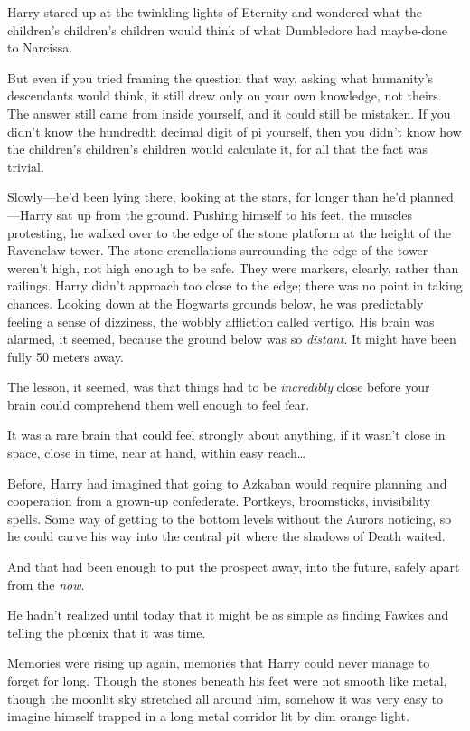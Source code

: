 Harry stared up at the twinkling lights of Eternity and wondered what the children's children's children would think of what Dumbledore had maybe-done to Narcissa.

But even if you tried framing the question that way, asking what humanity's descendants would think, it still drew only on your own knowledge, not theirs. The answer still came from inside yourself, and it could still be mistaken. If you didn't know the hundredth decimal digit of pi yourself, then you didn't know how the children's children's children would calculate it, for all that the fact was trivial.

\later

Slowly—he'd been lying there, looking at the stars, for longer than he'd planned—Harry sat up from the ground. Pushing himself to his feet, the muscles protesting, he walked over to the edge of the stone platform at the height of the Ravenclaw tower. The stone crenellations surrounding the edge of the tower weren't high, not high enough to be safe. They were markers, clearly, rather than railings. Harry didn't approach too close to the edge; there was no point in taking chances. Looking down at the Hogwarts grounds below, he was predictably feeling a sense of dizziness, the wobbly affliction called vertigo. His brain was alarmed, it seemed, because the ground below was so \emph{distant}. It might have been fully 50 meters away.

The lesson, it seemed, was that things had to be \emph{incredibly} close before your brain could comprehend them well enough to feel fear.

It was a rare brain that could feel strongly about anything, if it wasn't close in space, close in time, near at hand, within easy reach{\ldots}

Before, Harry had imagined that going to Azkaban would require planning and cooperation from a grown-up confederate. Portkeys, broomsticks, invisibility spells. Some way of getting to the bottom levels without the Aurors noticing, so he could carve his way into the central pit where the shadows of Death waited.

And that had been enough to put the prospect away, into the future, safely apart from the \emph{now}.

He hadn't realized until today that it might be as simple as finding Fawkes and telling the phœnix that it was time.

Memories were rising up again, memories that Harry could never manage to forget for long. Though the stones beneath his feet were not smooth like metal, though the moonlit sky stretched all around him, somehow it was very easy to imagine himself trapped in a long metal corridor lit by dim orange light.

